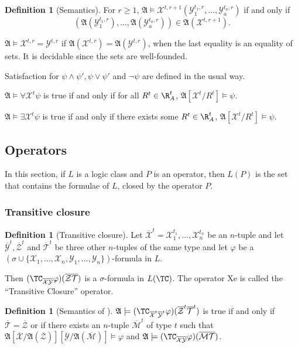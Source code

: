 \documentclass[a4paper,12pt]{article}
\newcommand{\sss}[1]{\subsubsection{#1}}
\newcommand{\emphdex}[1]{\index{#1}\emph{#1}}
\theoremstyle{definition}
\newtheorem{definition}[theorem]{Definition}
\renewcommand{\phi}{\varphi}
\newcommand{\mc}{\mathcal}
\newcommand{\mf}{\mathfrak}
\newcommand{\ol}{\overline}
\newcommand{\olmc}[1]{\overline{\mathcal{#1}}}
\begin{document}
\begin{definition}[Semantics]
  For $r\ge1$, $\mathfrak A\models\mathcal X^{t,r+1}(\mathcal
  Y^{t_{1},r}_1,\dots,\mathcal Y^{t_{a},r}_a)$ if and only if
  \[(\mathfrak A(\mathcal Y_1^{t_{1},r}),\dots,\mathfrak A(\mathcal
  Y_a^{t_{a},r}))\in\mathfrak A(\mathcal X^{t,r+1}).\]

  $\mathfrak A\models\mathcal X^{t,r}=\mathcal Y^{t,r}$ if $\mathfrak
  A(\mathcal X^{t,r})=\mathfrak A(\mathcal Y^{t,r})$, when the last
  equality is an equality of sets. It is decidable since the sets are
  well-founded.

  Satisfaction for $\psi\land\psi', \psi\lor \psi'$ and $\neg\psi$ are
  defined in the usual way.

  $\mathfrak A\models\forall \mathcal X^{t} \psi$ is true if and
  only if for all $R^{t}\in\R^{t}_{A} $, $\mathfrak
  A[\mathcal X^{t}/R^{t}]\models\psi$. 

  $\mathfrak A\models\exists \mathcal X^{t} \psi$ is true if and only
  if there exists some $R^{t}\in\R^{t}_{A} $, $\mathfrak A[\mathcal
  X^{t}/R^{t}]\models\psi$.
\end{definition}
\subsection{Operators}
In this section, if $L$ is a logic class and $P$ is an operator, then
\emphdex{$L(P)$} is the set  that contains the formulae of $L$, closed
by the operator $P$.

\sss{Transitive closure}
\begin{definition}[Transitive closure]


  Let $\olmc X^{t}=\mc X_1^{t_1},\dots,\mc X_n^{t_n}$ be an $n$-tuple
  and let $\olmc Y^{t},\olmc Z^{t}$ and $\olmc T^{t}$ be three other
  $n$-tuples of the same type and let $\phi$ be a $(\sigma\cup\{\mc
  X_{1},\dots,\mc X_{n},\mc Y_{1},\dots,\mc Y_{n}\})$-formula in $L$.

  Then $(\TC_{\ol{\mc X}\ol{\mc Y}}\phi)(\ol{\mc Z}\ol{\mc T})$ is a
  $\sigma$-formula in $L(\TC)$. The operator \TC{}Xe is called the
  ``Transitive Closure'' operator.

\end{definition}
\begin{definition}[Semantics of \TC]
  $\mathfrak A\models (\TC_{\ol{\mc X}^{t}\ol{\mc
      Y}^{t}}\phi)(\ol{\mc Z}^{t}\ol{\mc T}^{t})$ is true if and only
  if $\olmc T=\olmc Z$ or if there exists an $n$-tuple $\olmc M^{t}$
  of type $t$ such that $\mathfrak A[\olmc
  X/\mf A(\olmc Z)][\olmc Y/\mf A(\olmc M)]\models\phi$ and $\mathfrak A\models
  (\TC_{\ol{\mc X}\ol{\mc Y}}\phi)(\ol{\mc
    M}\ol{\mc T})$.\end{definition}
\end{document}
